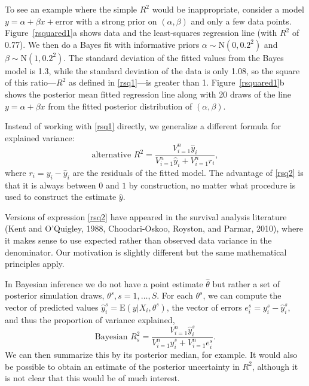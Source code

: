 \documentclass[11pt]{article}
\begin{document}
To see an example where the simple $R^2$ would be inappropriate, consider a model
$y = \alpha + \beta x+\mbox{error}$
with a strong prior on $(\alpha,\beta)$ and only a few data points.
Figure~\ref{rsquared1}a shows data and the least-squares regression line (with
$R^2$ of 0.77).  We then do a Bayes fit with informative priors
$\alpha \sim \mbox{N}(0,0.2^2)$ and $\beta \sim \mbox{N}(1,0.2^2)$.  The
standard deviation of the fitted values from the Bayes model is 1.3, while the
standard deviation of the data is only 1.08, so the square of this
ratio---$R^2$ as defined in \eqref{rsq1}---is greater than 1.
Figure~\ref{rsquared1}b shows the posterior mean fitted regression line along
with 20 draws of the line $y = \alpha + \beta x$ from the fitted posterior
distribution of $(\alpha,\beta)$.


Instead of working with \eqref{rsq1} directly, we generalize a different formula
for explained variance:
%
\begin{equation}\label{rsq2}
\mbox{alternative } R^2 = \frac{V_{i=1}^n\hat{y}_i}{V_{i=1}^n \hat{y}_i  + V_{i=1}^n r_i},
\end{equation}
%
where $r_i = y_i -\hat{y}_i$ are the residuals of the fitted model.
The advantage of \eqref{rsq2} is that it is always between $0$ and $1$ by
construction, no matter what procedure is used to construct the estimate
$\hat{y}$.

Versions of expression \eqref{rsq2} have appeared in the survival analysis
literature (Kent and O'Quigley, 1988, Choodari-Oskoo, Royston, and Parmar,
2010), where it makes sense to use expected rather than observed data variance
in the denominator.  Our motivation is slightly different but the same
mathematical principles apply.

In Bayesian inference we do not have a point estimate $\hat{\theta}$ but rather
a set of posterior simulation draws, $\theta^s, s=1,\ldots,S$.
For each $\theta^s$, we can compute the vector of predicted values
$\hat{y}_i^s = \mbox{E}(y | X_i,\theta^s)$, the vector of errors
$e_i^s = y_i^s - \hat{y}_i^s$, and thus the proportion of variance explained,
%
\begin{equation}\label{rsq3}
\mbox{Bayesian } R^2_s=\frac{V_{i=1}^n\hat{y}_i^s}{V_{i=1}^n \hat{y}_i^s  + V_{i=1}^n e_i^s}.
\end{equation}
%
We can then summarize this by its posterior median, for example. It would also
be possible to obtain an estimate of the posterior uncertainty in $R^2$,
although it is not clear that this would be of much interest.
\end{document}
